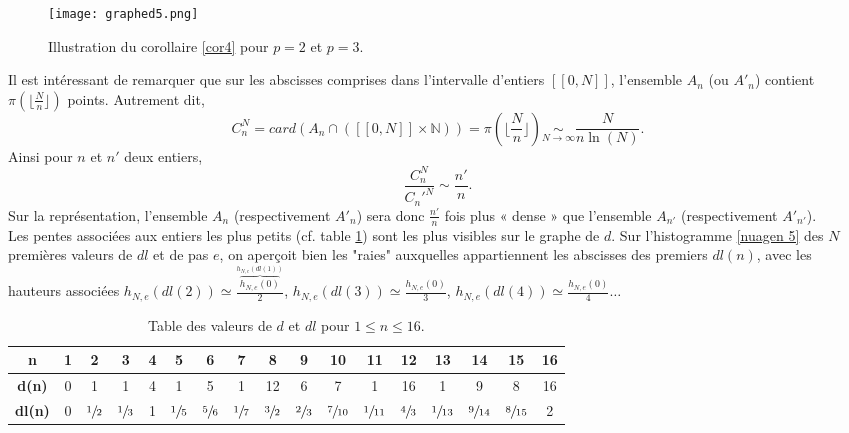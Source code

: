 \documentclass[a4paper, 12pt]{article}
\newcommand{\N}{\mathbb{N}}
\begin{document}
\begin{figure}[!ht]
\begin{center}
\texttt{[image: graphed5.png]}
\end{center}
\caption{\footnotesize{Illustration du corollaire \ref{cor4} pour $p=2$ et $p=3$.}}
\label{nuage 4}
\end{figure}


Il est intéressant de remarquer que sur les abscisses comprises dans l'intervalle d'entiers $[\![0, N]\!]$, l'ensemble $A_n$ (ou $A'_n$) contient $\pi(\lfloor \frac{N}{n} \rfloor)$ points. Autrement dit,
\[C_n^N = card(A_n \cap ([\![0, N]\!] \times \N)) = \pi(\lfloor \frac{N}{n} \rfloor) \underset{N \to \infty}{\sim} \frac{N}{n\ln(N)}. \]
 Ainsi pour $n$ et $n'$ deux entiers,
\[ \frac{C_n^N}{C_n'^N} \sim \frac{n'}{n}. \]
Sur la représentation, l'ensemble $A_n$ (respectivement $A'_n$) sera donc $\frac{n'}{n}$ fois plus « dense » que l'ensemble $A_{n'}$ (respectivement $A'_{n'}$). \\
Les pentes associées aux entiers les plus petits (cf. table \ref{tab1}) sont les plus visibles sur le graphe de $d$. Sur l'histogramme \ref{nuagen 5} des $N$ premières valeurs de $dl$ et de pas $e$, on aperçoit bien les "raies" auxquelles appartiennent les abscisses des premiers $dl(n)$, avec les hauteurs associées $h_{N,e}(dl(2)) \simeq \frac{\overbrace{h_{N,e}(0)}^{h_{N,e}(dl(1))}} {2}$, $h_{N,e}(dl(3)) \simeq \frac{h_{N,e}(0)}{3}$, $h_{N,e}(dl(4)) \simeq \frac{h_{N,e}(0)}{4} \dots$

\begin{table}[!ht] \label{tab1}
\begin{center}
\begin{tabular}{|c|c|c|c|c|c|c|c|c|c|c|c|c|c|c|c|c|}
\hline
\textbf{n} & \textbf{1} & \textbf{2} & \textbf{3} & \textbf{4} & \textbf{5} & \textbf{6} & \textbf{7} & \textbf{8} & \textbf{9} & \textbf{10} & \textbf{11} & \textbf{12} & \textbf{13} & \textbf{14} & \textbf{15} & \textbf{16}\\
\hline
\textbf{d(n)} & 0 & 1 & 1 & 4 & 1 & 5 & 1 & 12 & 6 & 7 & 1 & 16 & 1 & 9 & 8 & 16 \\
\hline
\textbf{dl(n)} & 0 & $\sfrac{1}{2}$ & $\sfrac{1}{3}$ & 1 & $\sfrac{1}{5}$ & $\sfrac{5}{6}$ & $\sfrac{1}{7}$ & $\sfrac{3}{2}$ & $\sfrac{2}{3}$ & $\sfrac{7}{10}$ & $\sfrac{1}{11}$ & $\sfrac{4}{3}$ & $\sfrac{1}{13}$ & $\sfrac{9}{14}$ & $\sfrac{8}{15}$ & 2\\
\hline
\end{tabular}
\end{center}
\caption{Table des valeurs de $d$ et $dl$ pour $1 \le n \le 16.$}
\label{tab1}
\end{table}
\end{document}
